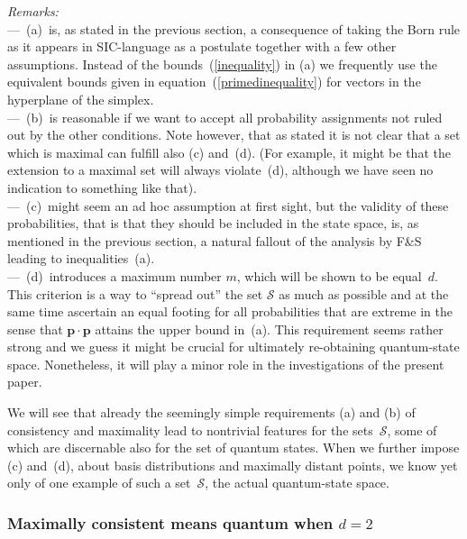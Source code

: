 \documentclass[letterpaper,11pt]{article}
\begin{document}
\noindent
\emph{Remarks:}\\[3pt]  %
%
---~(a)~is, as stated in the previous section, a consequence of taking the Born rule as it appears in SIC-language as a postulate together with a few other assumptions. Instead of the bounds~(\ref{inequality}) in (a) we frequently use the equivalent bounds given in equation~(\ref{primedinequality}) for vectors in the hyperplane of the simplex.\\[3pt]
%
---~(b)~is reasonable if we want to accept all probability assignments not ruled out by the other conditions.  Note however, that as stated it is not clear that a set which is maximal can fulfill also (c) and~(d). (For example, it might be that the extension to a maximal set will always violate~(d), although we have seen no indication to something like that).\\[3pt]
%
---~(c)~might seem an ad hoc assumption at first sight, but the validity of these probabilities, that is that they should be included in the state space, is, as mentioned in the previous section, a natural fallout of the analysis by F\&S~\cite{Fuchs&Schack} leading to inequalities~(a).\\[3pt]
%
---~(d)~introduces a maximum number $m$, which will be shown to be equal~$d$. This criterion is a way to ``spread out'' the set $\mathcal S$ as much as possible and at the same time ascertain an equal footing for all probabilities that are extreme in the sense that $\mathbf{p\cdot p}$ attains the upper bound in~(a). This requirement seems rather strong and we guess it might be crucial for ultimately re-obtaining quantum-state space.  Nonetheless, it will play a minor role in the investigations of the present paper.

\vspace{2mm}

We will see that already the seemingly simple requirements (a) and (b) of consistency and maximality lead to nontrivial features for the sets~$\mathcal S$, some of which are discernable also for the set of quantum states. When we further impose (c) and~(d), about basis distributions and maximally distant points, we know yet only of one example of such a set~$\mathcal S$, the actual quantum-state space.


\subsubsection{Maximally consistent means quantum when $d=2$} %
\end{document}
